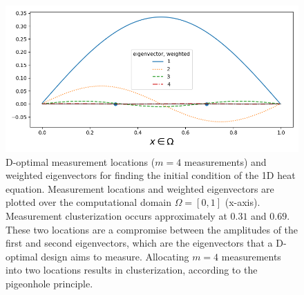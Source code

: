 \begin{figure}\label{fig:eigenvectors}
    \centering
    \includegraphics[width=\textwidth]{../latex/figs/eigenvectors_dst_scaled.png}
    \caption{D-optimal measurement locations ($m=4$ measurements) and
      weighted eigenvectors for finding the initial condition of the
      1D heat equation. Measurement locations and weighted
      eigenvectors are plotted over the computational domain $\Omega =
      [0, 1]$ (x-axis). Measurement clusterization occurs
      approximately at $0.31$ and $0.69$. These two locations are a
      compromise between the amplitudes of the first and second
      eigenvectors, which are the eigenvectors that a D-optimal design
      aims to measure. Allocating $m=4$ measurements into two
      locations results in clusterization, according to the pigeonhole
      principle.}
  \label{fig:why}
\end{figure}



